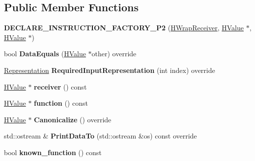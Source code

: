 \subsection*{Public Member Functions}
\begin{DoxyCompactItemize}
\item 
{\bfseries D\+E\+C\+L\+A\+R\+E\+\_\+\+I\+N\+S\+T\+R\+U\+C\+T\+I\+O\+N\+\_\+\+F\+A\+C\+T\+O\+R\+Y\+\_\+\+P2} (\hyperlink{classv8_1_1internal_1_1_h_wrap_receiver}{H\+Wrap\+Receiver}, \hyperlink{classv8_1_1internal_1_1_h_value}{H\+Value} $\ast$, \hyperlink{classv8_1_1internal_1_1_h_value}{H\+Value} $\ast$)\hypertarget{classv8_1_1internal_1_1_h_wrap_receiver_a67f4eaf3145ced3b351b062676095095}{}\label{classv8_1_1internal_1_1_h_wrap_receiver_a67f4eaf3145ced3b351b062676095095}

\item 
bool {\bfseries Data\+Equals} (\hyperlink{classv8_1_1internal_1_1_h_value}{H\+Value} $\ast$other) override\hypertarget{classv8_1_1internal_1_1_h_wrap_receiver_adc7064d225a7a73a73da92cfae861f7b}{}\label{classv8_1_1internal_1_1_h_wrap_receiver_adc7064d225a7a73a73da92cfae861f7b}

\item 
\hyperlink{classv8_1_1internal_1_1_representation}{Representation} {\bfseries Required\+Input\+Representation} (int index) override\hypertarget{classv8_1_1internal_1_1_h_wrap_receiver_a19163c24928f44762ad7b68d512088b5}{}\label{classv8_1_1internal_1_1_h_wrap_receiver_a19163c24928f44762ad7b68d512088b5}

\item 
\hyperlink{classv8_1_1internal_1_1_h_value}{H\+Value} $\ast$ {\bfseries receiver} () const \hypertarget{classv8_1_1internal_1_1_h_wrap_receiver_a8a3d6bc70f264e3be3286dd4337d23c9}{}\label{classv8_1_1internal_1_1_h_wrap_receiver_a8a3d6bc70f264e3be3286dd4337d23c9}

\item 
\hyperlink{classv8_1_1internal_1_1_h_value}{H\+Value} $\ast$ {\bfseries function} () const \hypertarget{classv8_1_1internal_1_1_h_wrap_receiver_a0148a2d4dcebee579eb33686d88b7f22}{}\label{classv8_1_1internal_1_1_h_wrap_receiver_a0148a2d4dcebee579eb33686d88b7f22}

\item 
\hyperlink{classv8_1_1internal_1_1_h_value}{H\+Value} $\ast$ {\bfseries Canonicalize} () override\hypertarget{classv8_1_1internal_1_1_h_wrap_receiver_ace4d700bedcf86cbb04b828128657269}{}\label{classv8_1_1internal_1_1_h_wrap_receiver_ace4d700bedcf86cbb04b828128657269}

\item 
std\+::ostream \& {\bfseries Print\+Data\+To} (std\+::ostream \&os) const  override\hypertarget{classv8_1_1internal_1_1_h_wrap_receiver_a0f43a7cf829612d0f9286336a9c1fb9f}{}\label{classv8_1_1internal_1_1_h_wrap_receiver_a0f43a7cf829612d0f9286336a9c1fb9f}

\item 
bool {\bfseries known\+\_\+function} () const \hypertarget{classv8_1_1internal_1_1_h_wrap_receiver_a2aa38819bf90283a839a625f4b9fa257}{}\label{classv8_1_1internal_1_1_h_wrap_receiver_a2aa38819bf90283a839a625f4b9fa257}

\end{DoxyCompactItemize}
